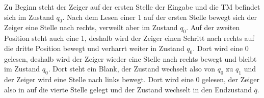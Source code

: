 \begin{aufgabe}
Zu Beginn steht der Zeiger auf der ersten Stelle der Eingabe und die TM befindet sich im Zustand $q_0$. Nach dem Lesen einer 1 auf der ersten Stelle
bewegt sich der Zeiger eine Stelle nach rechts, verweilt aber im Zustand $q_0$. Auf der zweiten Position steht auch eine 1, deshalb wird der Zeiger 
einen Schritt nach rechts auf die dritte Position bewegt und verharrt weiter in Zustand $q_0$. Dort wird eine 0 gelesen, deshalb wird der Zeiger wieder
eine Stelle nach rechts bewegt und bleibt im Zustand $q_0$. Dort steht ein Blank, der Zustand wechselt also von $q_0$ zu $q_1$ und der Zeiger wird
eine Stelle nach links bewegt. Dort wird eine 0 gelesen, der Zeiger also in auf die vierte Stelle gelegt und der Zustand wechselt in den Endzustand $\bar{q}$.


\end{aufgabe}